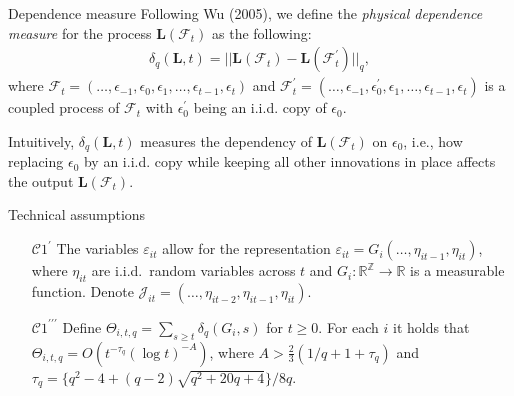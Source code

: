 \documentclass[10pt]{beamer}
\newcommand{\reals}{\mathbb{R}}
\begin{document}
\begin{frame}{Dependence measure}
Following Wu (2005), we define the \textit{physical dependence measure} for the process $\boldsymbol{L}(\mathcal{F}_t)$ as the following:
\begin{align*}
 \delta_q(\boldsymbol{L}, t) = || \boldsymbol{L}(\mathcal{F}_t) - \boldsymbol{L}(\mathcal{F}_t^\prime) ||_q,
\end{align*}
where $\mathcal{F}_t  = (\ldots, \epsilon_{-1}, \epsilon_0, \epsilon_1, \ldots, \epsilon_{t-1}, \epsilon_t)$ and $\mathcal{F}_t^\prime  = (\ldots, \epsilon_{-1}, \epsilon^\prime_0, \epsilon_1, \ldots, \epsilon_{t-1}, \epsilon_t)$ is a coupled process of $\mathcal{F}_t$ with $\epsilon_0^\prime$ being an i.i.d. copy of $\epsilon_0$.\pause

Intuitively, $\delta_q(\boldsymbol{L}, t)$ measures the dependency of $\boldsymbol{L}(\mathcal{F}_t)$ on $\epsilon_0$, i.e., how replacing $\epsilon_0$ by an i.i.d. copy while keeping all other innovations in place affects the output $\boldsymbol{L}(\mathcal{F}_t)$.
\end{frame}

\begin{frame}[label=tech_assumptions]{Technical assumptions}
\begin{enumerate}

\item[$\mathcal{C}1^\prime$] The variables $\varepsilon_{it}$ allow for the representation $\varepsilon_{it} = G_i(\ldots,\eta_{it-1},\eta_{it})$, where $\eta_{it}$ are i.i.d.\ random variables across $t$ and $G_i: \mathbb{R}^\mathbb{Z} \rightarrow \reals$ is a measurable function. Denote $\mathcal{J}_{it} = (\ldots,\eta_{it-2},\eta_{it-1},\eta_{it})$.

\item[$\mathcal{C}1^{\prime\prime\prime}$]  Define $\Theta_{i, t,q} = \sum\nolimits_{s \ge t} \delta_q(G_i, s)$ for $t \ge 0$. For each $i$ it holds that \linebreak
$\Theta_{i, t,q} = O ( t^{-\tau_q} (\log t)^{-A} )$,  
where $A > \frac{2}{3} (1/q + 1 + \tau_q)$ and \linebreak $\tau_q = \{q^2 - 4 + (q-2) \sqrt{q^2 + 20q + 4}\} / 8q$. \hyperlink{frame_assumptions<3>}{}

\end{enumerate}

\end{frame}
\end{document}

